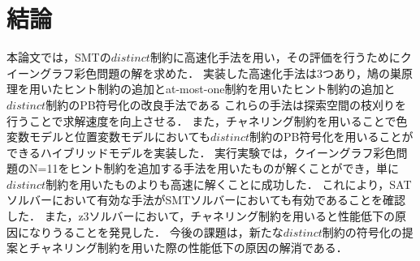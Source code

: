 \chapter{結論}

本論文では，SMTの$distinct$制約に高速化手法を用い，その評価を行うためにクイーングラフ彩色問題の解を求めた．
実装した高速化手法は3つあり，鳩の巣原理を用いたヒント制約の追加とat-most-one制約を用いたヒント制約の追加と$distinct$制約のPB符号化の改良手法である
これらの手法は探索空間の枝刈りを行うことで求解速度を向上させる．
また，チャネリング制約を用いることで色変数モデルと位置変数モデルにおいても$distinct$制約のPB符号化を用いることができるハイブリッドモデルを実装した．
実行実験では，クイーングラフ彩色問題のN=11をヒント制約を追加する手法を用いたものが解くことができ，単に$distinct$制約を用いたものよりも高速に解くことに成功した．
これにより，SATソルバーにおいて有効な手法がSMTソルバーにおいても有効であることを確認した．
また，z3ソルバーにおいて，チャネリング制約を用いると性能低下の原因になりうることを発見した．
今後の課題は，新たな$distinct$制約の符号化の提案とチャネリング制約を用いた際の性能低下の原因の解消である．


